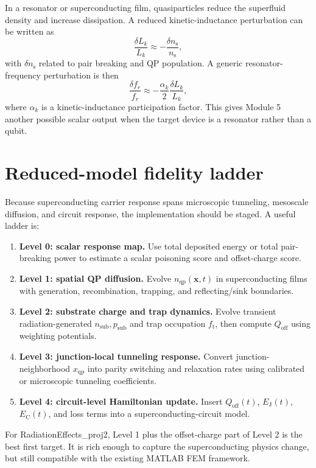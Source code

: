 \documentclass[11pt]{article}
\newcommand{\x}{\bm{x}}
\newcommand{\Ns}{n_{\mathrm{s}}}
\newcommand{\nqp}{n_{\mathrm{qp}}}
\newcommand{\xqp}{x_{\mathrm{qp}}}
\newcommand{\EJ}{E_{\mathrm{J}}}
\newcommand{\EC}{E_{\mathrm{C}}}
\newcommand{\Qoff}{Q_{\mathrm{off}}}
\newcommand{\ft}{f_{\mathrm{t}}}
\begin{document}
In a resonator or superconducting film, quasiparticles reduce the superfluid density and increase dissipation. A reduced kinetic-inductance perturbation can be written as
\begin{equation}
\frac{\delta L_k}{L_k}\approx -\frac{\delta \Ns}{\Ns},
\end{equation}
with \(\delta \Ns\) related to pair breaking and QP population. A generic resonator-frequency perturbation is then
\begin{equation}
\frac{\delta f_r}{f_r}\approx -\frac{\alpha_k}{2}\frac{\delta L_k}{L_k},
\end{equation}
where \(\alpha_k\) is a kinetic-inductance participation factor. This gives Module 5 another possible scalar output when the target device is a resonator rather than a qubit.

\section{Reduced-model fidelity ladder}

Because superconducting carrier response spans microscopic tunneling, mesoscale diffusion, and circuit response, the implementation should be staged. A useful ladder is:

\begin{enumerate}[leftmargin=2em]
\item \textbf{Level 0: scalar response map.} Use total deposited energy or total pair-breaking power to estimate a scalar poisoning score and offset-charge score.
\item \textbf{Level 1: spatial QP diffusion.} Evolve \(\nqp(\x,t)\) in superconducting films with generation, recombination, trapping, and reflecting/sink boundaries.
\item \textbf{Level 2: substrate charge and trap dynamics.} Evolve transient radiation-generated \(n_{\mathrm{sub}},p_{\mathrm{sub}}\) and trap occupation \(\ft\), then compute \(\Qoff\) using weighting potentials.
\item \textbf{Level 3: junction-local tunneling response.} Convert junction-neighborhood \(\xqp\) into parity switching and relaxation rates using calibrated or microscopic tunneling coefficients.
\item \textbf{Level 4: circuit-level Hamiltonian update.} Insert \(\Qoff(t)\), \(\EJ(t)\), \(\EC(t)\), and loss terms into a superconducting-circuit model.
\end{enumerate}

For RadiationEffects\_proj2, Level 1 plus the offset-charge part of Level 2 is the best first target. It is rich enough to capture the superconducting physics change, but still compatible with the existing MATLAB FEM framework.
\end{document}
